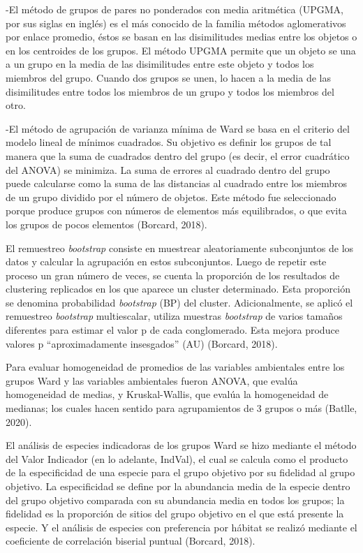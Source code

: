 \documentclass[11pt,]{article}
\begin{document}
-El método de grupos de pares no ponderados con media aritmética (UPGMA,
por sus siglas en inglés) es el más conocido de la familia métodos
aglomerativos por enlace promedio, éstos se basan en las disimilitudes
medias entre los objetos o en los centroides de los grupos. El método
UPGMA permite que un objeto se una a un grupo en la media de las
disimilitudes entre este objeto y todos los miembros del grupo. Cuando
dos grupos se unen, lo hacen a la media de las disimilitudes entre todos
los miembros de un grupo y todos los miembros del otro.

-El método de agrupación de varianza mínima de Ward se basa en el
criterio del modelo lineal de mínimos cuadrados. Su objetivo es definir
los grupos de tal manera que la suma de cuadrados dentro del grupo (es
decir, el error cuadrático del ANOVA) se minimiza. La suma de errores al
cuadrado dentro del grupo puede calcularse como la suma de las
distancias al cuadrado entre los miembros de un grupo dividido por el
número de objetos. Este método fue seleccionado porque produce grupos
con números de elementos más equilibrados, o que evita los grupos de
pocos elementos (Borcard, 2018).

El remuestreo \emph{bootstrap} consiste en muestrear aleatoriamente
subconjuntos de los datos y calcular la agrupación en estos
subconjuntos. Luego de repetir este proceso un gran número de veces, se
cuenta la proporción de los resultados de clustering replicados en los
que aparece un cluster determinado. Esta proporción se denomina
probabilidad \emph{bootstrap} (BP) del cluster. Adicionalmente, se
aplicó el remuestreo \emph{bootstrap} multiescalar, utiliza muestras
\emph{bootstrap} de varios tamaños diferentes para estimar el valor p de
cada conglomerado. Esta mejora produce valores p ``aproximadamente
insesgados'' (AU) (Borcard, 2018).

Para evaluar homogeneidad de promedios de las variables ambientales
entre los grupos Ward y las variables ambientales fueron ANOVA, que
evalúa homogeneidad de medias, y Kruskal-Wallis, que evalúa la
homogeneidad de medianas; los cuales hacen sentido para agrupamientos de
3 grupos o más (Batlle, 2020).

El análisis de especies indicadoras de los grupos Ward se hizo mediante
el método del Valor Indicador (en lo adelante, IndVal), el cual se
calcula como el producto de la especificidad de una especie para el
grupo objetivo por su fidelidad al grupo objetivo. La especificidad se
define por la abundancia media de la especie dentro del grupo objetivo
comparada con su abundancia media en todos los grupos; la fidelidad es
la proporción de sitios del grupo objetivo en el que está presente la
especie. Y el análisis de especies con preferencia por hábitat se
realizó mediante el coeficiente de correlación biserial puntual
(Borcard, 2018).
\end{document}
